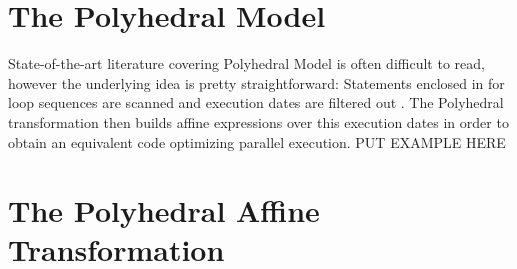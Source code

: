\documentclass[12pt, a4paper, twocolumn]{article}
\begin{document}

\twocolumn[
  \begin{@twocolumnfalse}
    \maketitle
    \begin{abstract}
      \abstractText
      \newline
      \newline
    \end{abstract}
  \end{@twocolumnfalse}
]


\section{The Polyhedral Model}

State-of-the-art literature covering Polyhedral Model is often difficult to read, however the underlying idea is pretty straightforward: Statements enclosed in for loop sequences are scanned and execution dates are filtered out . The Polyhedral transformation then builds affine expressions over this execution dates in order to obtain an equivalent code optimizing parallel execution.
PUT EXAMPLE HERE

\section{The Polyhedral Affine Transformation}

\lipsum[1]


\nocite{*}


\end{document}
